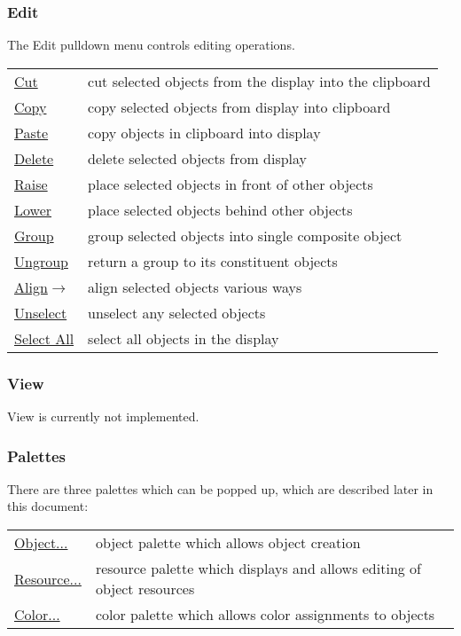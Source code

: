 \subsubsection{Edit}

The Edit pulldown menu controls editing operations.\\

\begin{tabular}{ll}
\underline{Cut}  & cut selected objects from the display into the clipboard\\
\underline{Copy}  & copy selected objects from display into clipboard\\
\underline{Paste}  & copy objects in clipboard into display\\
\underline{Delete}  & delete selected objects from display \\
\underline{Raise}  & place selected objects in front of other objects\\
\underline{Lower}  & place selected objects behind other objects\\
\underline{Group}  & group selected objects into single composite object\\
\underline{Ungroup}  & return a group to its constituent objects\\
\underline{Align$\rightarrow$}  & align selected objects various ways\\
\underline{Unselect}  & unselect any selected objects\\
\underline{Select All}  & select all objects in the display\\
\end{tabular}

\subsubsection{View}

View is currently not implemented.

\subsubsection{Palettes}

There are three palettes which can be popped up, which are described later in
this document:\\

\begin{tabular}{ll}
\underline{Object...} & object palette which allows object creation\\
\underline{Resource...} & resource palette which displays and allows editing of object resources\\
\underline{Color...} & color palette which allows color assignments to objects\\
\end{tabular}

